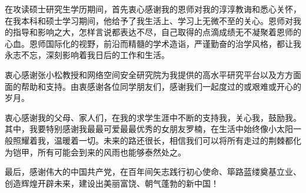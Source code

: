 在攻读硕士研究生学历期间，首先衷心感谢我的恩师对我的淳淳教诲和悉心关怀，在我本科和硕士学习期间，他给予了我生活上、学习上无微不至的关心。恩师对我的指导和影响之大，怎样言说都表达不尽，自己取得的点滴成绩无不凝聚着恩师的心血。恩师国际化的视野，前沿而精髓的学术造诣，严谨勤奋的治学风格，都让我永志不忘，深刻影响着我日后的工作和生活。

衷心感谢张小松教授和网络空间安全研究院为我提供的高水平研究平台以及方方面面的帮助和支持。由衷感谢各位同学朋友们，感谢我们一起度过的或艰难或开心的岁月。

衷心感谢我的父母、家人们，在我的求学生涯中不断的支持我，关心我，鼓励我。其中，我要特别感谢我最最可爱最最优秀的女朋友罗楠，在生活中始终像小太阳一般照耀着我，温暖着一切。未来的路还很长，相信我们可以将所有走过的荆棘都化为铠甲，所有可能会到来的风雨也能够泰然处之。

最后，感谢伟大的中国共产党，在百年间矢志践行初心使命、筚路蓝缕奠基立业、创造辉煌开辟未来，建设出美丽富饶、朝气蓬勃的新中国！